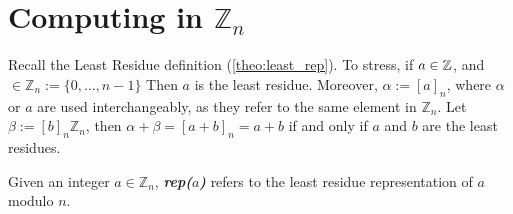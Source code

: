 \newpage 
\section{Computing in \(\mathbb{Z}_n\)}
Recall the Least Residue definition (\ref{theo:least_rep}). 
To stress, if $a\in\mathbb{Z}$, and $\in\mathbb{Z}_n:=\{0,\dots,n-1\}$ Then $a$ is the least residue.
Moreover, $\alpha:=[a]_n$, where $\alpha$ or $a$ are used interchangeably, as they refer to the same element in $\mathbb{Z}_n$.
Let $\beta:=[b]_n\mathbb{Z}_n$, then $\alpha+\beta=[a+b]_n=a+b$ if and only if $a$ and $b$ are the least residues. 

\begin{Func}

    Given an integer $a \in \mathbb{Z}_n$, \textbf{\textit{rep($a$)}} refers to the least residue representation of $a$ modulo $n$.
\end{Func}

